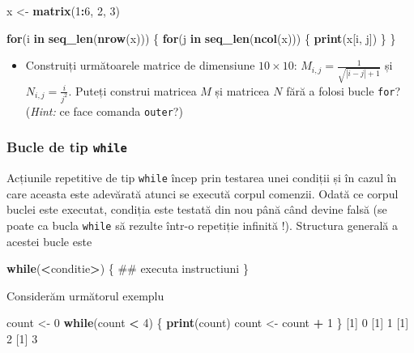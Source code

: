 \documentclass[]{article}
\newenvironment{Shaded}{\begin{snugshade}}{\end{snugshade}}
\newcommand{\KeywordTok}[1]{\textcolor[rgb]{0.13,0.29,0.53}{\textbf{#1}}}
\newcommand{\DecValTok}[1]{\textcolor[rgb]{0.00,0.00,0.81}{#1}}
\newcommand{\StringTok}[1]{\textcolor[rgb]{0.31,0.60,0.02}{#1}}
\newcommand{\ControlFlowTok}[1]{\textcolor[rgb]{0.13,0.29,0.53}{\textbf{#1}}}
\newcommand{\OperatorTok}[1]{\textcolor[rgb]{0.81,0.36,0.00}{\textbf{#1}}}
\newcommand{\NormalTok}[1]{#1}
\newenvironment{frshaded*}{%
  \def\FrameCommand{\fboxrule=\FrameRule\fboxsep=\FrameSep \fcolorbox{framecolor}{shadecolor1}}%
  \MakeFramed {\advance\hsize-\width \FrameRestore}}%
{\endMakeFramed}
\newenvironment{rmdblock}[1]
  {\begin{frshaded*}
  \begin{itemize}
  \renewcommand{\labelitemi}{
    \raisebox{-.7\height}[0pt][0pt]{
      {\setkeys{Gin}{width=2em,keepaspectratio}\texttt{[image: images/icons/\#1]}}
    }
  }
  \item
  }
  {
  \end{itemize}
  \end{frshaded*}
  }
\newenvironment{rmdexercise}
  {\begin{rmdblock}{exercise}}
  {\end{rmdblock}}
\begin{document}
\begin{Shaded}
\begin{Highlighting}[]
\NormalTok{x <-}\StringTok{ }\KeywordTok{matrix}\NormalTok{(}\DecValTok{1}\OperatorTok{:}\DecValTok{6}\NormalTok{, }\DecValTok{2}\NormalTok{, }\DecValTok{3}\NormalTok{)}

\ControlFlowTok{for}\NormalTok{(i }\ControlFlowTok{in} \KeywordTok{seq_len}\NormalTok{(}\KeywordTok{nrow}\NormalTok{(x))) \{}
        \ControlFlowTok{for}\NormalTok{(j }\ControlFlowTok{in} \KeywordTok{seq_len}\NormalTok{(}\KeywordTok{ncol}\NormalTok{(x))) \{}
                \KeywordTok{print}\NormalTok{(x[i, j])}
\NormalTok{        \}   }
\NormalTok{\}}
\end{Highlighting}
\end{Shaded}

\begin{rmdexercise}
Construiți următoarele matrice de dimensiune \(10 \times 10\):
\(M_{i,j} = \frac{1}{\sqrt{|i-j|+1}}\) și \(N_{i,j} = \frac{i}{j^2}\).
Puteți construi matricea \(M\) și matricea \(N\) fără a folosi bucle
\texttt{for}? (\emph{Hint:} ce face comanda \texttt{outer}?)
\end{rmdexercise}

\subsubsection{\texorpdfstring{Bucle de tip
\texttt{while}}{Bucle de tip while}}\label{bucle-de-tip-while}

Acțiunile repetitive de tip \texttt{while} încep prin testarea unei
condiții și în cazul în care aceasta este adevărată atunci se execută
corpul comenzii. Odată ce corpul buclei este executat, condiția este
testată din nou până când devine falsă (se poate ca bucla \texttt{while}
să rezulte într-o repetiție infinită !). Structura generală a acestei
bucle este

\begin{Shaded}
\begin{Highlighting}[]
\ControlFlowTok{while}\NormalTok{(}\OperatorTok{<}\NormalTok{conditie}\OperatorTok{>}\NormalTok{) \{}
\NormalTok{        ## executa instructiuni}
\NormalTok{\} }
\end{Highlighting}
\end{Shaded}

Considerăm următorul exemplu

\begin{Shaded}
\begin{Highlighting}[]
\NormalTok{count <-}\StringTok{ }\DecValTok{0}
\ControlFlowTok{while}\NormalTok{(count }\OperatorTok{<}\StringTok{ }\DecValTok{4}\NormalTok{) \{}
        \KeywordTok{print}\NormalTok{(count)}
\NormalTok{        count <-}\StringTok{ }\NormalTok{count }\OperatorTok{+}\StringTok{ }\DecValTok{1}
\NormalTok{\}}
\NormalTok{[}\DecValTok{1}\NormalTok{] }\DecValTok{0}
\NormalTok{[}\DecValTok{1}\NormalTok{] }\DecValTok{1}
\NormalTok{[}\DecValTok{1}\NormalTok{] }\DecValTok{2}
\NormalTok{[}\DecValTok{1}\NormalTok{] }\DecValTok{3}
\end{Highlighting}
\end{Shaded}
\end{document}
